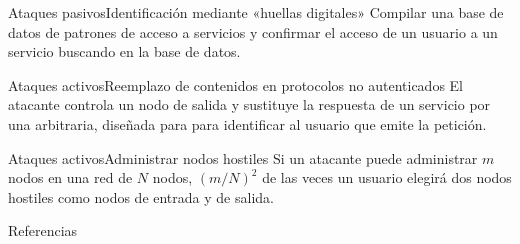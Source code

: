 \documentclass[spanish]{beamer}
\begin{document}
\begin{frame}{Ataques pasivos}{Identificación mediante «huellas digitales»}
  Compilar una base de datos de patrones de acceso a servicios y confirmar el acceso de
  un usuario a un servicio buscando en la base de datos.
\end{frame}

\begin{frame}{Ataques activos}{Reemplazo de contenidos en protocolos no autenticados}
  El atacante controla un nodo de salida y sustituye la respuesta de un servicio
  por una arbitraria, diseñada para para identificar al usuario que emite la
  petición.
\end{frame}

\begin{frame}{Ataques activos}{Administrar nodos hostiles}
 Si un atacante puede administrar $m$ nodos en una red de $N$ nodos,
 $\left(m/N\right)^2$ de las veces un usuario elegirá dos nodos
 hostiles como nodos de entrada y de salida.
\end{frame}

\begin{frame}[t,allowframebreaks]{Referencias}
  \printbibliography[heading=none]
\end{frame}
\end{document}
